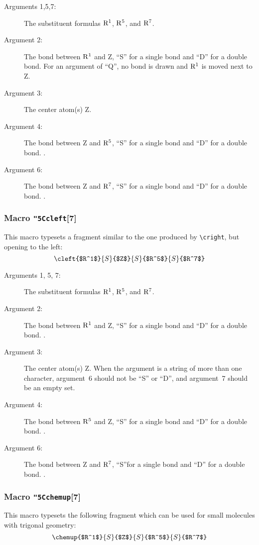  \begin{description}
 \item[{\rm Arguments 1,5,7:}] The substituent formulas
      ${\rm R^1}$, ${\rm R^5}$, and ${\rm R^7}$.
 \item[{\rm Argument 2:}] The bond between ${\rm R^1}$
      and Z, ``S'' for a single bond and ``D'' for a double
      bond. For an argument of ``Q'', no bond is drawn and
      ${\rm R^1}$ is moved next to Z.
 \item[{\rm Argument 3:}] The center atom(s) Z.
 \item[{\rm Argument 4:}] The bond between Z and
      ${\rm R^5}$, ``S'' for a single bond and ``D'' for
      a double bond. \ri .
 \item[{\rm Argument 6:}] The bond between Z and ${\rm R^7}$,
      ``S'' for a single bond and ``D'' for a double bond. \ri .
 \end{description}
 
\subsubsection{Macro {\tt\char"5C{}cleft}[7]}
   This macro typesets a fragment similar to the one produced
 by \verb+\cright+, but opening to the left:
 \[ \cleft{$R^1$}{S}{$Z$}{S}{$R^5$}{S}{$R^7$}  \]
 
 \begin{description}
 \item[{\rm Arguments 1, 5, 7:}] The substituent formulas
      ${\rm R^1}$, ${\rm R^5}$, and ${\rm R^7}$.
 \item[{\rm Argument 2:}] The bond between ${\rm R^1}$
      and Z, ``S'' for a single bond and ``D'' for a double
      bond. \ri .
 \item[{\rm Argument 3:}] The center atom(s) Z.
      When the argument is a string of more than one character,
      argument~6 should not be ``S'' or ``D'', and argument~7
      should be an empty set.
 \item[{\rm Argument 4:}] The bond between ${\rm R^5}$
      and Z, ``S'' for a single bond and ``D'' for a double
      bond. \ri .
 \item[{\rm Argument 6:}] The bond between Z and
      ${\rm R^7}$, ``S''for a single bond and ``D'' for a
      double bond. \ri .
 \end{description}
 
\subsubsection{Macro {\tt\char"5C{}chemup}[7]}
  This macro typesets the following fragment which can
 be used for small molecules with trigonal geometry:
 \[ \chemup{$R^1$}{S}{$Z$}{S}{$R^5$}{S}{$R^7$}  \]
 
